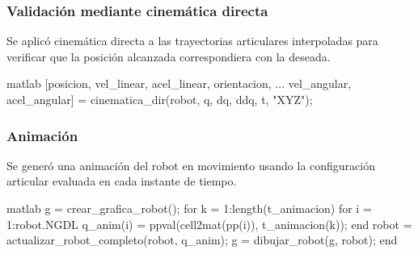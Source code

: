 \subsubsection*{Validación mediante cinemática directa}

Se aplicó cinemática directa a las trayectorias articulares interpoladas para verificar que la posición alcanzada correspondiera con la deseada.

\begin{matlabcode}{matlab}
	[posicion, vel_linear, acel_linear, orientacion, ...
	vel_angular, acel_angular] = cinematica_dir(robot, q, dq, ddq, t, "XYZ");
\end{matlabcode}

\subsubsection*{Animación}

Se generó una animación del robot en movimiento usando la configuración articular evaluada en cada instante de tiempo.

\begin{matlabcode}{matlab}
	g = crear_grafica_robot();
	for k = 1:length(t_animacion)
	for i = 1:robot.NGDL
	q_anim(i) = ppval(cell2mat(pp(i)), t_animacion(k));
	end
	robot = actualizar_robot_completo(robot, q_anim);
	g = dibujar_robot(g, robot);
	end
\end{matlabcode}

